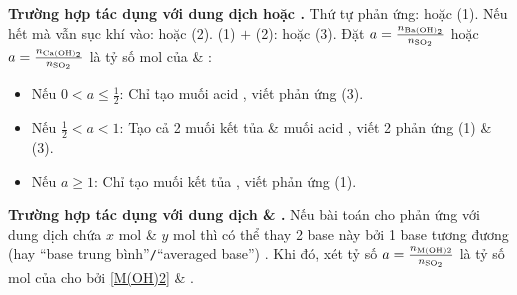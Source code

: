 \documentclass{article}
\begin{document}
\textbf{\textsf{Trường hợp  tác dụng với dung dịch  hoặc .}} Thứ tự phản ứng:  hoặc  (1). Nếu  hết mà vẫn sục khí  vào:  hoặc  (2). (1) $+$ (2):  hoặc  (3). Đặt $a = \frac{n_{\ce{Ba(OH)2}}}{n_{\ce{SO2}}}$ hoặc $a = \frac{n_{\ce{Ca(OH)2}}}{n_{\ce{SO2}}}$ là tỷ số mol của  \& :
\begin{itemize}
	\item Nếu $0 < a\le\frac{1}{2}$: Chỉ tạo muối acid , viết phản ứng (3).
	\item Nếu $\frac{1}{2} < a < 1$: Tạo cả 2 muối kết tủa  \& muối acid , viết 2 phản ứng (1) \& (3).
	\item Nếu $a\ge1$: Chỉ tạo muối kết tủa , viết phản ứng (1).
\end{itemize}
\textbf{\textsf{Trường hợp  tác dụng với dung dịch  \& .}} Nếu bài toán cho  phản ứng với dung dịch chứa $x$ mol  \& $y$ mol  thì có thể thay 2 base này bởi 1 base tương đương (hay ``base trung bình''{\tt/}``averaged base'') . Khi đó, xét tỷ số $a = \frac{n_{\rm M(OH)2}}{n_{\ce{SO2}}}$ là tỷ số mol của  cho bởi \eqref{M(OH)2} \& .
\vspace{2mm}
\end{document}
